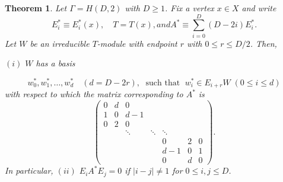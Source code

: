 \documentclass[
]{book}
\newtheorem{theorem}{Theorem}[chapter]
\theoremstyle{definition}
\theoremstyle{definition}
\theoremstyle{definition}
\theoremstyle{definition}
\theoremstyle{remark}
\begin{document}
\begin{theorem}
\protect\hypertarget{thm:hd2-modules2}{}\label{thm:hd2-modules2}Let \(\Gamma = H(D,2)\) with \(D\geq 1\). Fix a vertex \(x\in X\) and write
\[E^*_i \equiv E^*_i(x), \quad T = T(x), and A^* \equiv \sum_{i=0}^D(D-2i)E^*_i.\]
Let \(W\) be an irreducible \(T\)-module with endpoint \(r\) with \(0\leq r\leq D/2\). Then,

\((i)\) \(W\) has a basis

\[w_0^*, w_1^*, \ldots, w_d^* \quad(d = D-2r), \; \text{ such that }\; w_i^*\in E_{i+r}W\; (0\leq i \leq d)\]
with respect to which the matrix corresponding to \(A^*\) is
\[\begin{pmatrix} 
0 & d & 0   &  & & &  \\
1 & 0 & d-1 &  & & & \\
0 & 2 & 0   &  & & & \\
  &   & \ddots    & \ddots & \ddots &  & \\
  &   &                   & & 0 & 2 & 0 \\
  &   &      & & d-1 & 0 & 1\\
  &   &      & & 0 & d & 0
\end{pmatrix}.\]
In particular,
\textbar{} \((ii)\) \(E_iA^*E_j = 0\) if \(|i-j|\neq 1\) for \(0 \leq i, j\leq D\).
\end{theorem}
\end{document}
